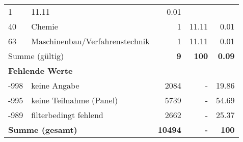 \begin{longtable}{lXrrr}
       \num{1} &
       \num[round-mode=places,round-precision=2]{11,11} &
         \num[round-mode=places,round-precision=2]{0,01} \\

     40 &
     \multicolumn{1}{X}{ Chemie   } &


       \num{1} &
       \num[round-mode=places,round-precision=2]{11,11} &
         \num[round-mode=places,round-precision=2]{0,01} \\

     63 &
     \multicolumn{1}{X}{ Maschinenbau/Verfahrenstechnik   } &


       \num{1} &
       \num[round-mode=places,round-precision=2]{11,11} &
         \num[round-mode=places,round-precision=2]{0,01} \\
     \midrule
     \multicolumn{2}{l}{Summe (gültig)} &
       \textbf{\num{9}} &
     \textbf{100} &
       \textbf{\num[round-mode=places,round-precision=2]{0,09}} \\
     \multicolumn{5}{l}{\textbf{Fehlende Werte}}\\
       -998 &
       keine Angabe &
         \num{2084} &
        - &
         \num[round-mode=places,round-precision=2]{19,86} \\
       -995 &
       keine Teilnahme (Panel) &
         \num{5739} &
        - &
         \num[round-mode=places,round-precision=2]{54,69} \\
       -989 &
       filterbedingt fehlend &
         \num{2662} &
        - &
         \num[round-mode=places,round-precision=2]{25,37} \\
     \midrule
     \multicolumn{2}{l}{\textbf{Summe (gesamt)}} &
          \textbf{\num{10494}} &
        \textbf{-} &
        \textbf{100} \\
     \bottomrule
     \end{longtable}
     
